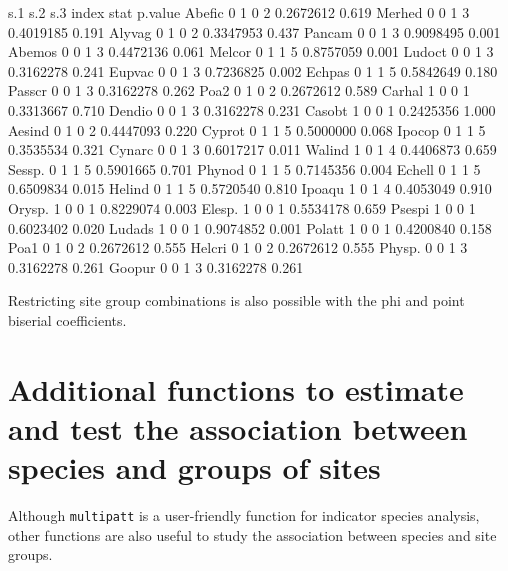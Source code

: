 \documentclass[11pt,a4paper]{article}
\begin{document}
\begin{Schunk}
\begin{Soutput}
       s.1 s.2 s.3 index      stat p.value
Abefic   0   1   0     2 0.2672612   0.619
Merhed   0   0   1     3 0.4019185   0.191
Alyvag   0   1   0     2 0.3347953   0.437
Pancam   0   0   1     3 0.9098495   0.001
Abemos   0   0   1     3 0.4472136   0.061
Melcor   0   1   1     5 0.8757059   0.001
Ludoct   0   0   1     3 0.3162278   0.241
Eupvac   0   0   1     3 0.7236825   0.002
Echpas   0   1   1     5 0.5842649   0.180
Passcr   0   0   1     3 0.3162278   0.262
Poa2     0   1   0     2 0.2672612   0.589
Carhal   1   0   0     1 0.3313667   0.710
Dendio   0   0   1     3 0.3162278   0.231
Casobt   1   0   0     1 0.2425356   1.000
Aesind   0   1   0     2 0.4447093   0.220
Cyprot   0   1   1     5 0.5000000   0.068
Ipocop   0   1   1     5 0.3535534   0.321
Cynarc   0   0   1     3 0.6017217   0.011
Walind   1   0   1     4 0.4406873   0.659
Sessp.   0   1   1     5 0.5901665   0.701
Phynod   0   1   1     5 0.7145356   0.004
Echell   0   1   1     5 0.6509834   0.015
Helind   0   1   1     5 0.5720540   0.810
Ipoaqu   1   0   1     4 0.4053049   0.910
Orysp.   1   0   0     1 0.8229074   0.003
Elesp.   1   0   0     1 0.5534178   0.659
Psespi   1   0   0     1 0.6023402   0.020
Ludads   1   0   0     1 0.9074852   0.001
Polatt   1   0   0     1 0.4200840   0.158
Poa1     0   1   0     2 0.2672612   0.555
Helcri   0   1   0     2 0.2672612   0.555
Physp.   0   0   1     3 0.3162278   0.261
Goopur   0   0   1     3 0.3162278   0.261
\end{Soutput}
\end{Schunk}
Restricting site group combinations is also possible with the phi and point biserial coefficients. 

\section{Additional functions to estimate and test the association between species and groups of sites}
Although \texttt{multipatt} is a user-friendly function for indicator species analysis, other functions are also useful to study the association between species and site groups. 
\end{document}
